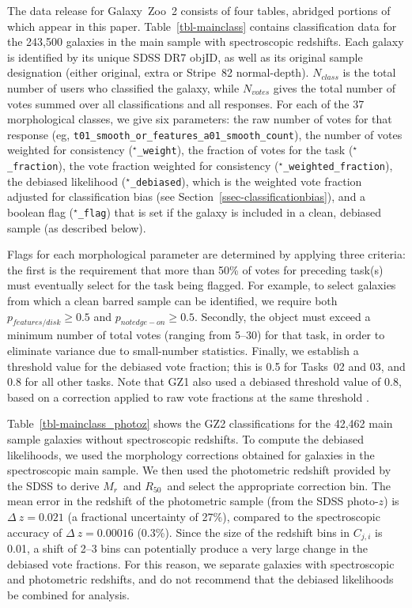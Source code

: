 \documentclass[useAMS,usenatbib]{mn2e}
\newcommand{\mr}{$M_r$}
\newcommand{\rfifty}{$R_{50}$}
\begin{document}
The data release for Galaxy~Zoo~2 consists of four tables, abridged portions of which appear in this paper. Table~\ref{tbl-mainclass} contains classification data for the 243,500 galaxies in the main sample with spectroscopic redshifts. Each galaxy is identified by its unique SDSS DR7 objID, as well as its original sample designation (either original, extra or Stripe~82 normal-depth). $N_{class}$ is the total number of users who classified the galaxy, while $N_{votes}$ gives the total number of votes summed over all classifications and all responses. For each of the 37 morphological classes, we give six parameters: the raw number of votes for that response (eg, {\tt t01\_smooth\_or\_features\_a01\_smooth\_count}), the number of votes weighted for consistency ({\tt $^\star$\_weight}), the fraction of votes for the task ({\tt $^\star$\_fraction}), the vote fraction weighted for consistency ({\tt $^\star$\_weighted\_fraction}), the debiased likelihood ({\tt $^\star$\_debiased}), which is the weighted vote fraction adjusted for classification bias (see Section~\ref{ssec-classificationbias}), and a boolean flag ({\tt $^\star$\_flag}) that is set if the galaxy is included in a clean, debiased sample (as described below).

Flags for each morphological parameter are determined by applying three criteria: the first is the requirement that more than 50\% of votes for preceding task(s) must eventually select for the task being flagged. For example, to select galaxies from which a clean barred sample can be identified, we require both $p_{features/disk}\geq0.5$ and $p_{not edge-on}\geq0.5$. Secondly, the object must exceed a minimum number of total votes (ranging from 5--30) for that task, in order to eliminate variance due to small-number statistics. Finally, we establish a threshold value for the debiased vote fraction; this is 0.5 for Tasks~02 and 03, and 0.8 for all other tasks. Note that GZ1 also used a debiased threshold value of 0.8, based on a correction applied to raw vote fractions at the same threshold \citep{bam09,lin11}. 

Table~\ref{tbl-mainclass_photoz} shows the GZ2 classifications for the 42,462 main sample galaxies without spectroscopic redshifts. To compute the debiased likelihoods, we used the morphology corrections obtained for galaxies in the spectroscopic main sample. We then used the photometric redshift provided by the SDSS \citep{csa03} to derive \mr~and \rfifty~and select the appropriate correction bin. The mean error in the redshift of the photometric sample (from the SDSS photo-$z$) is $\Delta~z=0.021$ (a fractional uncertainty of 27\%), compared to the spectroscopic accuracy of $\Delta~z=0.00016$ (0.3\%). Since the size of the redshift bins in $C_{j,i}$ is 0.01, a shift of 2--3 bins can potentially produce a very large change in the debiased vote fractions. For this reason, we separate galaxies with spectroscopic and photometric redshifts, and do not recommend that the debiased likelihoods be combined for analysis. 
\end{document}
